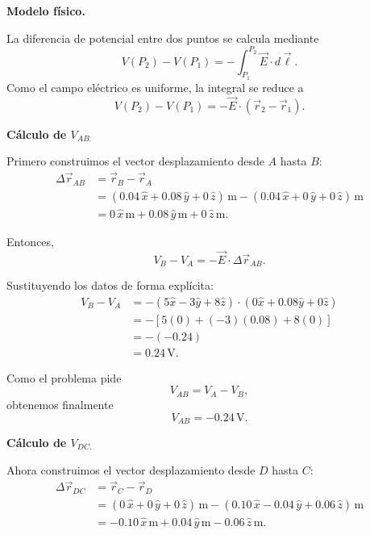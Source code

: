 \documentclass[11pt]{article}
\begin{document}
\textbf{Modelo f\'isico.}

La diferencia de potencial entre dos puntos se calcula mediante
\begin{equation*}
    V(P_2)-V(P_1)=-\int_{P_1}^{P_2}\vec E\cdot d\vec \ell.
\end{equation*}
Como el campo el\'ectrico es uniforme, la integral se reduce a
\begin{equation*}
    V(P_2)-V(P_1)=-\vec E\cdot(\vec r_2-\vec r_1).
\end{equation*}

\textbf{C\'alculo de $V_{AB.}$}

Primero construimos el vector desplazamiento desde $A$ hasta $B$:
\begin{align*}
    \Delta \vec r_{AB}
    &=\vec r_B-\vec r_A\\
    &=(0.04\,\hat{x}+0.08\,\hat{y}+0\,\hat{z})\,\text{m}
      -(0.04\,\hat{x}+0\,\hat{y}+0\,\hat{z})\,\text{m}\\
    &=0\,\hat{x}\,\text{m}+0.08\,\hat{y}\,\text{m}+0\,\hat{z}\,\text{m}.
\end{align*}

Entonces,
\begin{equation*}
    V_B-V_A=-\vec E\cdot\Delta \vec r_{AB}.
\end{equation*}

Sustituyendo los datos de forma expl\'icita:
\begin{align*}
    V_B-V_A
    &=-\left(5\hat{x}-3\hat{y}+8\hat{z}\right)\cdot
      \left(0\hat{x}+0.08\hat{y}+0\hat{z}\right)\\
    &=-\left[5(0)+(-3)(0.08)+8(0)\right]\\
    &=-(-0.24)\\
    &=0.24\,\text{V}.
\end{align*}

Como el problema pide
\begin{equation*}
    V_{AB}=V_A-V_B,
\end{equation*}
obtenemos finalmente
\begin{equation*}
    \boxed{V_{AB}=-0.24\,\text{V}.}
\end{equation*}

\textbf{C\'alculo de $V_{DC.}$}

Ahora construimos el vector desplazamiento desde $D$ hasta $C$:
\begin{align*}
    \Delta \vec r_{DC}
    &=\vec r_C-\vec r_D\\
    &=(0\,\hat{x}+0\,\hat{y}+0\,\hat{z})\,\text{m}
      -(0.10\,\hat{x}-0.04\,\hat{y}+0.06\,\hat{z})\,\text{m}\\
    &=-0.10\,\hat{x}\,\text{m}+0.04\,\hat{y}\,\text{m}-0.06\,\hat{z}\,\text{m}.
\end{align*}
\end{document}
